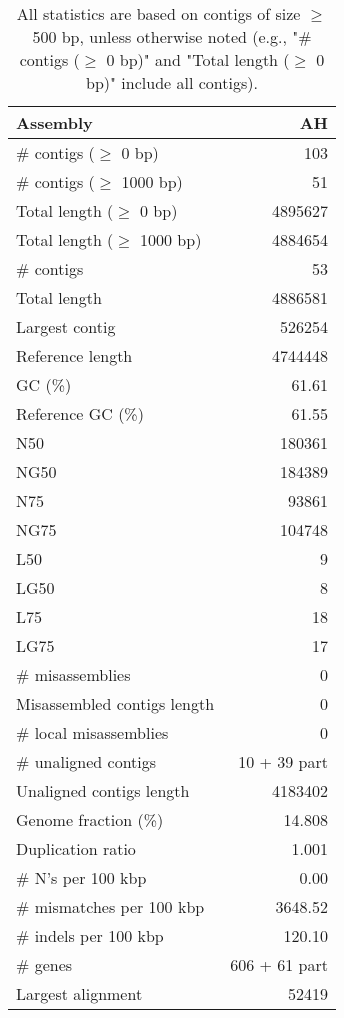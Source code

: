 \documentclass[12pt,a4paper]{article}
\begin{document}
\begin{table}[ht]
\begin{center}
\caption{All statistics are based on contigs of size $\geq$ 500 bp, unless otherwise noted (e.g., "\# contigs ($\geq$ 0 bp)" and "Total length ($\geq$ 0 bp)" include all contigs).}
\begin{tabular}{|l*{1}{|r}|}
\hline
Assembly & AH \\ \hline
\# contigs ($\geq$ 0 bp) & 103 \\ \hline
\# contigs ($\geq$ 1000 bp) & 51 \\ \hline
Total length ($\geq$ 0 bp) & 4895627 \\ \hline
Total length ($\geq$ 1000 bp) & 4884654 \\ \hline
\# contigs & 53 \\ \hline
Total length & 4886581 \\ \hline
Largest contig & 526254 \\ \hline
Reference length & 4744448 \\ \hline
GC (\%) & 61.61 \\ \hline
Reference GC (\%) & 61.55 \\ \hline
N50 & 180361 \\ \hline
NG50 & 184389 \\ \hline
N75 & 93861 \\ \hline
NG75 & 104748 \\ \hline
L50 & 9 \\ \hline
LG50 & 8 \\ \hline
L75 & 18 \\ \hline
LG75 & 17 \\ \hline
\# misassemblies & 0 \\ \hline
Misassembled contigs length & 0 \\ \hline
\# local misassemblies & 0 \\ \hline
\# unaligned contigs & 10 + 39 part \\ \hline
Unaligned contigs length & 4183402 \\ \hline
Genome fraction (\%) & 14.808 \\ \hline
Duplication ratio & 1.001 \\ \hline
\# N's per 100 kbp & 0.00 \\ \hline
\# mismatches per 100 kbp & 3648.52 \\ \hline
\# indels per 100 kbp & 120.10 \\ \hline
\# genes & 606 + 61 part \\ \hline
Largest alignment & 52419 \\ \hline
\end{tabular}
\end{center}
\end{table}
\end{document}
